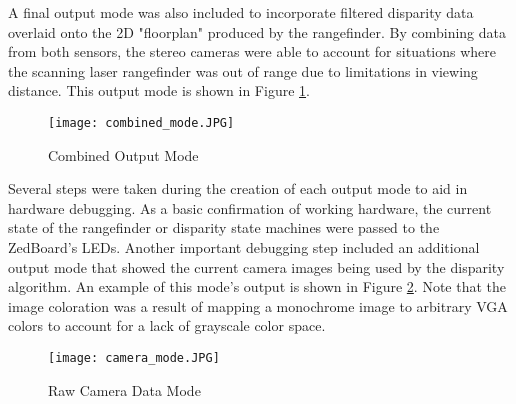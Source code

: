 \par
A final output mode was also included to incorporate filtered disparity data overlaid onto the 2D "floorplan" produced by the rangefinder. By combining data from both sensors, the stereo cameras were able to account for situations where the scanning laser rangefinder was out of range due to limitations in viewing distance. This output mode is shown in Figure \ref{combinedOut}.
\par
\begin{figure}[H]
	\centerline{
	\texttt{[image: combined\_mode.JPG]}
	}
	\caption{Combined Output Mode}
	\label{combinedOut}
\end{figure}
\par
Several steps were taken during the creation of each output mode to aid in hardware debugging. As a basic confirmation of working hardware, the current state of the rangefinder or disparity state machines were passed to the ZedBoard's LEDs. Another important debugging step included an additional output mode that showed the current camera images being used by the disparity algorithm. An example of this mode's output is shown in Figure \ref{camOutMode}. Note that the image coloration was a result of mapping a monochrome image to arbitrary VGA colors to account for a lack of grayscale color space.
\par
\begin{figure}[H]
	\centerline{
	\texttt{[image: camera\_mode.JPG]}
	}
	\caption{Raw Camera Data Mode}
	\label{camOutMode}
\end{figure}



